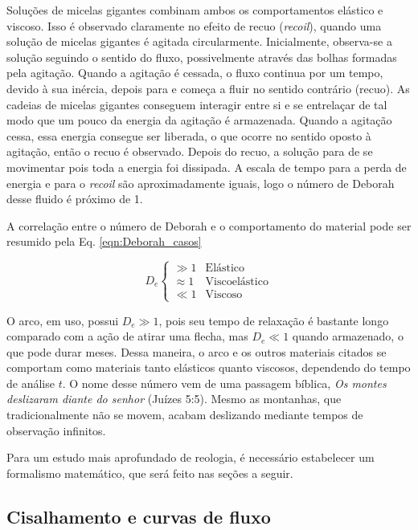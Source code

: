 		Soluções de micelas gigantes combinam ambos os comportamentos elástico e viscoso.  Isso é observado claramente no efeito de recuo (\emph{recoil}),  quando uma solução de micelas gigantes é agitada circularmente. Inicialmente, observa-se a solução seguindo o sentido do fluxo, possivelmente através das bolhas formadas pela agitação. Quando a agitação é cessada, o fluxo continua por um tempo, devido à sua inércia, depois para e começa a fluir no sentido contrário (recuo). As cadeias de micelas gigantes conseguem interagir entre si e se entrelaçar de tal modo que um pouco da energia da agitação é armazenada. Quando a agitação cessa, essa energia consegue ser liberada, o que ocorre no sentido oposto à agitação, então o recuo é observado. Depois do recuo, a solução para de se movimentar pois toda a energia foi dissipada. A escala de tempo para a perda de energia e para o \emph{recoil} são aproximadamente iguais, logo o número de Deborah desse fluido é próximo de 1.
		
		A correlação entre o número de Deborah e o comportamento do material pode ser resumido pela Eq. \ref{eqn:Deborah_casos}
		
		\begin{equation}
			D_e
			\begin{cases}
				\gg 1     & \textrm{Elástico}      \\
				\approx 1 & \textrm{Viscoelástico} \\
				\ll 1     & \textrm{Viscoso}
			\end{cases}
			\label{eqn:Deborah_casos}
		\end{equation} 
		
		O arco, em uso, possui \(D_e \gg 1\), pois seu tempo de relaxação é bastante longo comparado com a ação de atirar uma flecha, mas \(D_e \ll 1\) quando armazenado, o que pode durar meses. Dessa maneira, o arco e os outros materiais citados se comportam como materiais tanto elásticos quanto viscosos, dependendo do tempo de análise \(t\). O nome desse número vem de uma passagem bíblica, \emph{Os montes deslizaram diante do senhor} (Juízes 5:5). Mesmo as montanhas, que tradicionalmente não se movem, acabam deslizando mediante tempos de observação infinitos.
		
		Para um estudo mais aprofundado de reologia, é necessário estabelecer um formalismo matemático, que será feito nas seções a seguir.
		
			\subsection{Cisalhamento e curvas de fluxo} 
			
